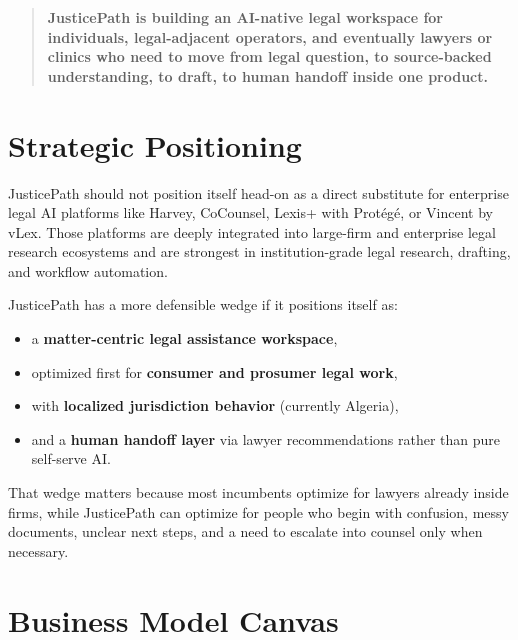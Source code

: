 \documentclass[11pt]{article}
\begin{document}
\begin{quote}
\textbf{JusticePath is building an AI-native legal workspace for individuals, legal-adjacent operators, and eventually lawyers or clinics who need to move from legal question, to source-backed understanding, to draft, to human handoff inside one product.}
\end{quote}

\section*{Strategic Positioning}
JusticePath should not position itself head-on as a direct substitute for enterprise legal AI platforms like Harvey, CoCounsel, Lexis+ with Prot\'eg\'e, or Vincent by vLex. Those platforms are deeply integrated into large-firm and enterprise legal research ecosystems and are strongest in institution-grade legal research, drafting, and workflow automation.

JusticePath has a more defensible wedge if it positions itself as:
\begin{itemize}
  \item a \textbf{matter-centric legal assistance workspace},
  \item optimized first for \textbf{consumer and prosumer legal work},
  \item with \textbf{localized jurisdiction behavior} (currently Algeria),
  \item and a \textbf{human handoff layer} via lawyer recommendations rather than pure self-serve AI.
\end{itemize}

That wedge matters because most incumbents optimize for lawyers already inside firms, while JusticePath can optimize for people who begin with confusion, messy documents, unclear next steps, and a need to escalate into counsel only when necessary.

\section*{Business Model Canvas}
\end{document}
